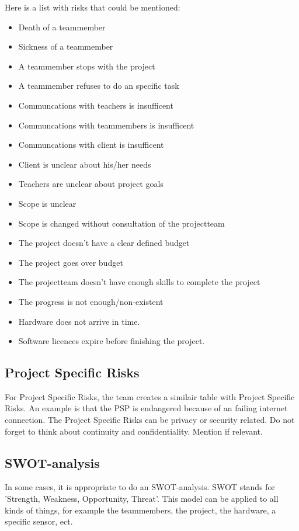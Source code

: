 \documentclass[10pt]{report}
\begin{document}
Here is a list with risks that could be mentioned:

\begin{itemize}
	\item Death of a teammember
	\item Sickness of a teammember
	\item A teammember stops with the project
	\item A teammember refuses to do an specific task
	\item Communcations with teachers is insufficent
	\item Communcations with teammembers is insufficent
	\item Communcations with client is insufficent
	\item Client is unclear about his/her needs
	\item Teachers are unclear about project goals
	\item Scope is unclear
	\item Scope is changed without consultation of the projectteam
	\item The project doesn't have a clear defined budget
	\item The project goes over budget
	\item The projectteam doesn't have enough skills to complete the project
	\item The progress is not enough/non-existent
	\item Hardware does not arrive in time.
	\item Software licences expire before finishing the project.
\end{itemize}

\subsection{Project Specific Risks}

For Project Specific Risks, the team creates a similair table with Project Specific Risks. An example is that the PSP is endangered because of an failing internet connection. The Project Specific Risks can be privacy or security related. Do not forget to think about continuity and confidentiality. Mention if relevant.

\subsection{SWOT-analysis}

In some cases, it is appropriate to do an SWOT-analysis. SWOT stands for 'Strength, Weakness, Opportunity, Threat'. This model can be applied to all kinds of things, for example the teammembers, the project, the hardware, a specific sensor, ect. 
\end{document}
